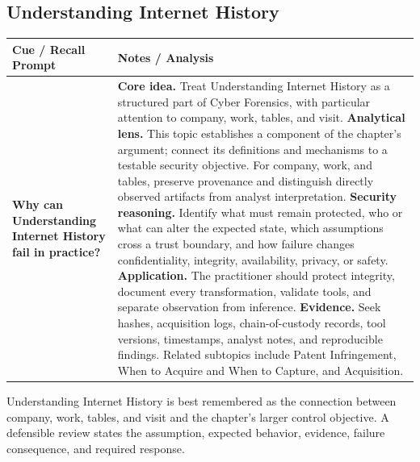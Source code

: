 \documentclass[11pt]{article}
\newcommand{\CornellHeader}{%
\rowcolor{Navy}\color{white}\bfseries Cue / Recall Prompt & \color{white}\bfseries Notes / Analysis\\\hline}
\newcommand{\CornellRow}[2]{%
\cellcolor{CueGray}\RaggedRight\textbf{#1} & \RaggedRight #2\\\hline}
\begin{document}
\subsection*{Understanding Internet History}
\begin{longtable}{>{\RaggedRight\arraybackslash}p{}|>{\RaggedRight\arraybackslash}p{}}
\CornellHeader
\CornellRow{Why can Understanding Internet History fail in practice?}{\textbf{Core idea.} Treat Understanding Internet History as a structured part of Cyber Forensics, with particular attention to company, work, tables, and visit. \textbf{Analytical lens.} This topic establishes a component of the chapter's argument; connect its definitions and mechanisms to a testable security objective. For company, work, and tables, preserve provenance and distinguish directly observed artifacts from analyst interpretation. \textbf{Security reasoning.} Identify what must remain protected, who or what can alter the expected state, which assumptions cross a trust boundary, and how failure changes confidentiality, integrity, availability, privacy, or safety. \textbf{Application.} The practitioner should protect integrity, document every transformation, validate tools, and separate observation from inference. \textbf{Evidence.} Seek hashes, acquisition logs, chain-of-custody records, tool versions, timestamps, analyst notes, and reproducible findings. Related subtopics include Patent Infringement, When to Acquire and When to Capture, and Acquisition.}
\end{longtable}
\begin{topicsummary}
Understanding Internet History is best remembered as the connection between company, work, tables, and visit and the chapter's larger control objective. A defensible review states the assumption, expected behavior, evidence, failure consequence, and required response.
\end{topicsummary}
\end{document}
